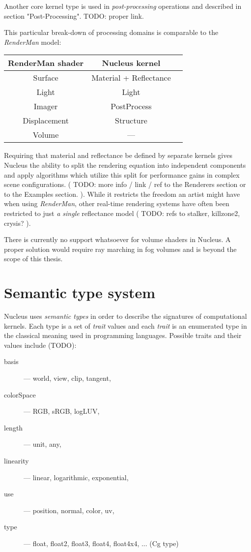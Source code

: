 Another core kernel type is used in \emph{post-processing} operations and described in section "Post-Processing". TODO: proper link.

This particular break-down of processing domains is comparable to the \emph{RenderMan} model:

\begin{center}
\begin{tabular}{ | c | c | c | }
\hline
RenderMan shader & Nucleus kernel \\
\hline
Surface & Material + Reflectance \\
Light & Light \\
Imager & PostProcess \\
Displacement & Structure \\
Volume & --- \\
\hline
\end{tabular}
\end{center}


Requiring that material and reflectance be defined by separate kernels gives Nucleus the ability to split the rendering equation into independent components and apply algorithms which utilize this split for performance gains in complex scene configurations. ( TODO: more info / link / ref to the Renderers section or to the Examples section. ). While it restricts the freedom an artist might have when using \emph{RenderMan}, other real-time rendering systems have often been restricted to just \emph{a single} reflectance model ( TODO: refs to stalker, killzone2, crysis? ).

There is currently no support whatsoever for volume shaders in Nucleus. A proper solution would require ray marching in fog volumes and is beyond the scope of this thesis.

\section{Semantic type system}

Nucleus uses \emph{semantic types} in order to describe the signatures of computational kernels. Each type is a set of \emph{trait} values and each \emph{trait} is an enumerated type in the classical meaning used in programming languages. Possible traits and their values include (TODO):
\begin{description}
\item[basis] --- world, view, clip, tangent,
\item[colorSpace] --- RGB, sRGB, logLUV,
\item[length] --- unit, any,
\item[linearity] --- linear, logarithmic, exponential,
\item[use] --- position, normal, color, uv,
\item[type] --- float, float2, float3, float4, float4x4, ... (Cg type)
\end{description}

